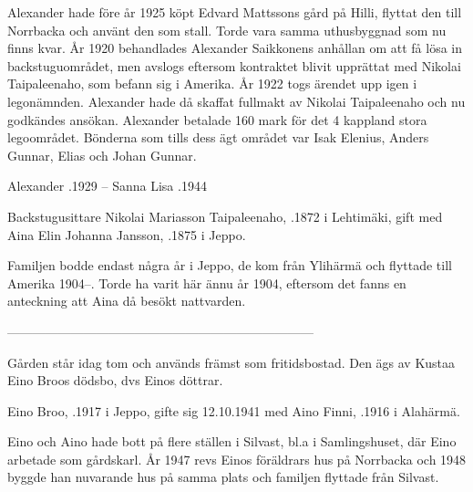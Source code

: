 Alexander hade före år 1925 köpt Edvard Mattssons gård på Hilli, flyttat den till Norrbacka och använt den som stall. Torde vara samma uthusbyggnad som nu finns kvar. År 1920 behandlades Alexander Saikkonens anhållan om att få lösa in backstuguområdet, men avslogs eftersom kontraktet blivit upprättat med Nikolai Taipaleenaho, som befann sig i Amerika. År 1922 togs ärendet upp igen i legonämnden. Alexander hade då skaffat fullmakt av Nikolai Taipaleenaho och nu godkändes ansökan. Alexander betalade 160 mark för det 4 kappland stora legoområdet. Bönderna som tills dess ägt området var Isak Elenius, Anders Gunnar, Elias och Johan Gunnar.

Alexander .1929  --  Sanna Lisa .1944


Backstugusittare Nikolai Mariasson Taipaleenaho, .1872 i Lehtimäki, gift med Aina Elin Johanna Jansson, .1875 i Jeppo.
\begin{jhchildren}
  \item {}
  \item {}
  \item {}
\end{jhchildren}
Familjen bodde endast några år i Jeppo, de kom från Ylihärmä och flyttade till Amerika 1904--. Torde ha varit här ännu år 1904, eftersom det fanns en anteckning att Aina då besökt nattvarden.


------------------------------------------------------------------------


Gården står idag tom och används främst som fritidsbostad. Den ägs av Kustaa Eino Broos dödsbo, dvs Einos döttrar.


Eino Broo, .1917 i Jeppo, gifte sig 12.10.1941 med Aino Finni, .1916 i Alahärmä.
\begin{jhchildren}
  \item {}
  \item {}
  \item {}
  \item {}
\end{jhchildren}
Eino och Aino hade bott på flere ställen i Silvast, bl.a i Samlingshuset, där Eino arbetade som gårdskarl. År 1947 revs Einos föräldrars hus på Norrbacka och 1948 byggde han nuvarande hus på samma plats och familjen flyttade från Silvast.

